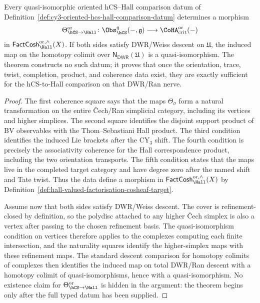 \begin{theorem}
\label{thm:oriented-hcs-hall-comparison-from-dwr-datum}
Every quasi-isomorphic oriented hCS--Hall comparison datum of
Definition~\ref{def:cy3-oriented-hcs-hall-comparison-datum} determines
a morphism
\[
 \Theta_{\hCS\to\Hall}^{\mathrm{or}}\colon
 \Obs_{\hCS}^{q}(-,\mathfrak g)
 \longrightarrow
 \CoHA_{\mathrm{crit}}^{\mathrm{or}}(-)
\]
in
$\mathsf{FactCosh}_{\Hall}^{\mathrm{or},\wedge}(X)$. If both sides
satisfy DWR/Weiss descent on $\mathfrak U$, the induced map on the
homotopy colimit over $\mathsf{N}_{\mathsf{DW\!R}}(\mathfrak U)$ is a
quasi-isomorphism. The theorem constructs no such datum; it proves that
once the orientation, trace, twist, completion, product, and coherence
data exist, they are exactly sufficient for the hCS-to-Hall comparison
on that DWR/Ran nerve.
\end{theorem}

\begin{proof}
The first coherence square says that the maps $\Theta_\sigma$ form a
natural transformation on the entire \v{C}ech/Ran simplicial category,
including its vertices and higher simplices. The second square identifies the disjoint
support product of BV observables with the Thom--Sebastiani Hall
product. The third condition identifies the induced Lie brackets after
the CY$_3$ shift. The fourth condition is precisely the associativity
coherence for the Hall correspondence product, including the two
orientation transports. The fifth condition states that the maps live
in the completed target category and have degree zero after the named
shift and Tate twist. Thus the data define a morphism in
$\mathsf{FactCosh}_{\Hall}^{\mathrm{or},\wedge}(X)$ by
Definition~\ref{def:hall-valued-factorisation-cosheaf-target}.

Assume now that both sides satisfy DWR/Weiss descent. The cover is
refinement-closed by definition, so the polydisc attached to any higher
\v{C}ech simplex is also a vertex after passing to the chosen
refinement basis. The quasi-isomorphism condition on vertices therefore
applies to the complexes computing each finite intersection, and the
naturality squares identify the higher-simplex maps with these
refinement maps. The standard descent comparison for homotopy colimits
of complexes then identifies the induced map on total DWR/Ran descent
with a homotopy colimit of quasi-isomorphisms, hence with a
quasi-isomorphism. No existence claim for
$\Theta_{\hCS\to\Hall}^{\mathrm{or}}$ is hidden in the argument: the
theorem begins only after the full typed datum has been supplied.
\end{proof}

